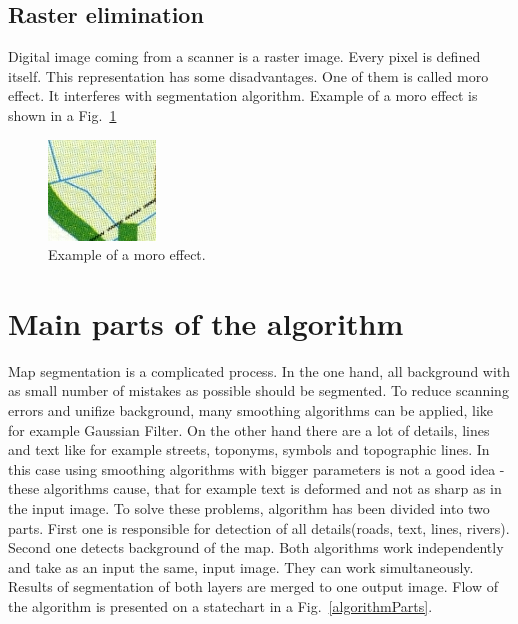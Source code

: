 \documentclass[a4paper,onecolumn,oneside,12pt]{memoir}
\begin{document}
\subsection{Raster elimination}

Digital image coming from a scanner is a raster image. Every pixel is defined itself. This
representation has some disadvantages. One of them is called moro effect. It interferes with
segmentation algorithm. Example of a moro effect is shown in a Fig.~\ref{moroEffectExample}

\begin{figure}[!ht]
\begin{center}
\includegraphics[scale=11.0]{images/moroEffectExample.jpg}
\caption{Example of a moro effect.}
\label{moroEffectExample}
\end{center}
\end{figure}

\section{Main parts of the algorithm}

Map segmentation is a complicated process. In the one hand, all background with as small number of
mistakes as possible should be segmented. To reduce scanning errors and unifize background, many 
smoothing algorithms can be applied, like for example Gaussian Filter. On the other hand there are a
lot of details, lines and text like for example streets, toponyms, symbols and topographic lines.
In this case using smoothing algorithms with bigger parameters is not a good idea - these algorithms
cause, that for example text is deformed and not as sharp as in the input image. To solve these
problems, algorithm has been divided into two parts. First one is responsible for detection of all
details(roads, text, lines, rivers). Second one detects background of the map. Both algorithms work
independently and take as an input the same, input image. They can work simultaneously. Results of
segmentation of both layers are merged to one output image. Flow of the algorithm is presented on a
statechart in a Fig.~\ref{algorithmParts}.
\end{document}
